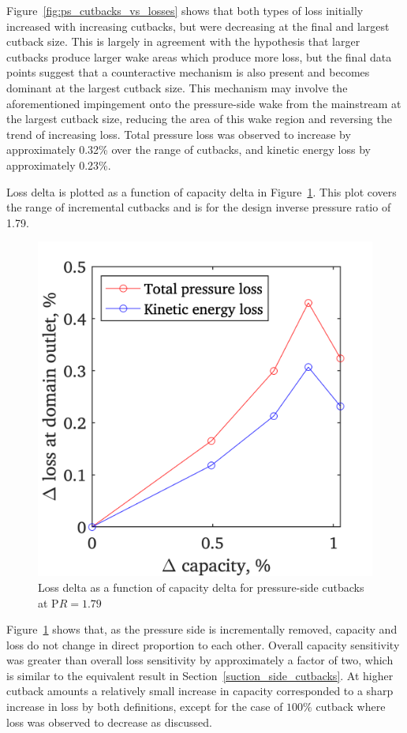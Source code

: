 \documentclass[a4paper, 11pt, oneside]{report}
\begin{document}
Figure~\ref{fig:ps_cutbacks_vs_losses} shows that both types of loss initially increased with increasing cutbacks, but were decreasing at the final and largest cutback size. This is largely in agreement with the hypothesis that larger cutbacks produce larger wake areas which produce more loss, but the final data points suggest that a counteractive mechanism is also present and becomes dominant at the largest cutback size. This mechanism may involve the aforementioned impingement onto the pressure-side wake from the mainstream at the largest cutback size, reducing the area of this wake region and reversing the trend of increasing loss. Total pressure loss was observed to increase by approximately 0.32\% over the range of cutbacks, and kinetic energy loss by approximately 0.23\%.

Loss delta is plotted as a function of capacity delta in Figure~\ref{fig:ps_capacities_vs_losses}. This plot covers the range of incremental cutbacks and is for the design inverse pressure ratio of 1.79.

\begin{figure}[H]
	\centering
	\includegraphics[width=.45\textwidth]{figs/ps_capacities_vs_losses.png}
	\caption{Loss delta as a function of capacity delta for pressure-side cutbacks at P$R=1.79$}
    \label{fig:ps_capacities_vs_losses}
\end{figure}

Figure~\ref{fig:ps_capacities_vs_losses} shows that, as the pressure side is incrementally removed, capacity and loss do not change in direct proportion to each other. Overall capacity sensitivity was greater than overall loss sensitivity by approximately a factor of two, which is similar to the equivalent result in Section~\ref{suction_side_cutbacks}. At higher cutback amounts a relatively small increase in capacity corresponded to a sharp increase in loss by both definitions, except for the case of $100\%$ cutback where loss was observed to decrease as discussed.
\end{document}
